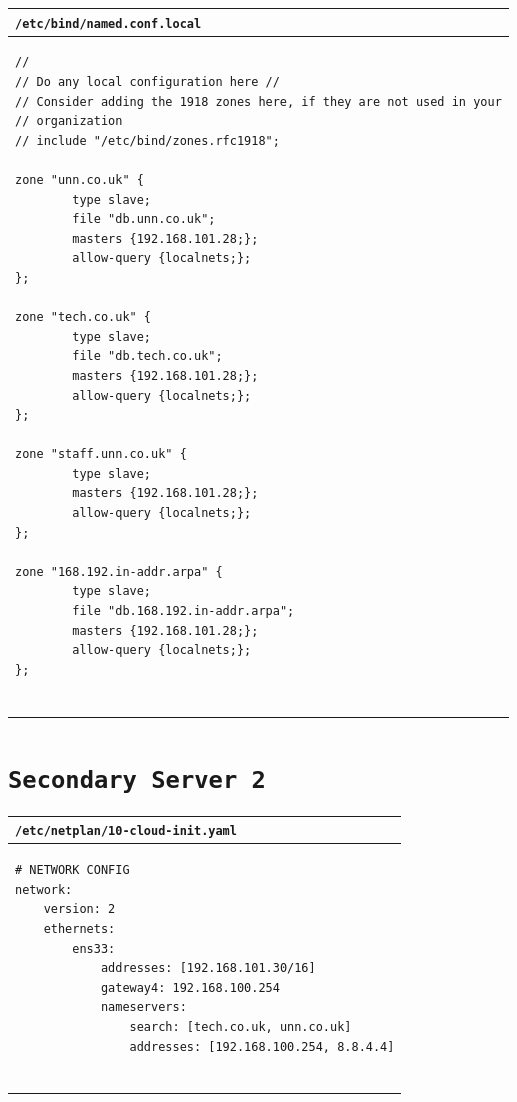 \documentclass[11pt]{article}
\begin{document}
\begin{table}[ht]
    \begin{tabular}{|p{17.7cm}|} 
        \hline
        \texttt{\textbf{/etc/bind/named.conf.local}}\\ 
        \hline
        \lstset{
                basicstyle=\scriptsize\ttfamily,
              }
              \begin{lstlisting}
// 
// Do any local configuration here //
// Consider adding the 1918 zones here, if they are not used in your
// organization
// include "/etc/bind/zones.rfc1918";
                
zone "unn.co.uk" {
        type slave;
        file "db.unn.co.uk";
        masters {192.168.101.28;};
        allow-query {localnets;};
};
                
zone "tech.co.uk" {
        type slave;
        file "db.tech.co.uk";
        masters {192.168.101.28;};
        allow-query {localnets;};
};
                
zone "staff.unn.co.uk" {
        type slave;
        masters {192.168.101.28;};
        allow-query {localnets;};
};
                
zone "168.192.in-addr.arpa" {
        type slave;
        file "db.168.192.in-addr.arpa";
        masters {192.168.101.28;};
        allow-query {localnets;};
};
                
        \end{lstlisting}\\
        \hline
    \end{tabular}
\end{table}

\clearpage

\section{\texttt{Secondary Server 2}}
\begin{table}[ht]
    \begin{tabular}{|p{17.7cm}|} 
        \hline
        \texttt{\textbf{/etc/netplan/10-cloud-init.yaml}}\\ 
        \hline
        \lstset{
                basicstyle=\scriptsize\ttfamily,
              }
              \begin{lstlisting}
# NETWORK CONFIG
network:
    version: 2
    ethernets:
        ens33:
            addresses: [192.168.101.30/16]
            gateway4: 192.168.100.254
            nameservers:
                search: [tech.co.uk, unn.co.uk]
                addresses: [192.168.100.254, 8.8.4.4]
                
        \end{lstlisting}\\
        \hline
    \end{tabular}
\end{table}
\end{document}

